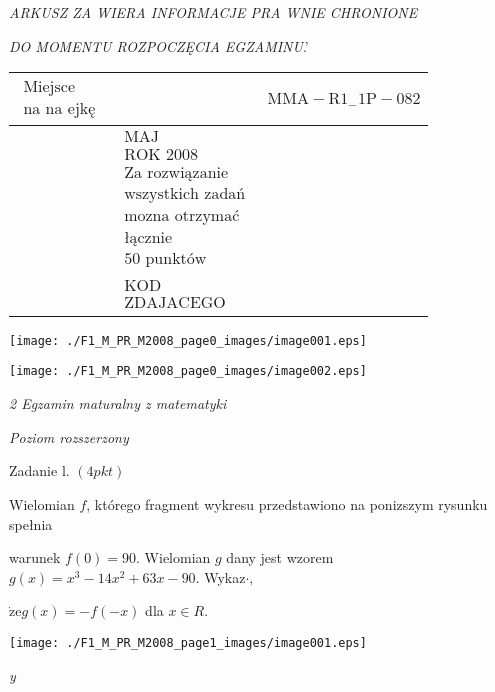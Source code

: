 \documentclass[a4paper,12pt]{article}
\begin{document}
{\it ARKUSZ ZA WIERA INFORMACJE PRA WNIE CHRONIONE}

{\it DO MOMENTU ROZPOCZĘCIA EGZAMINU}.'
\begin{center}
\begin{tabular}{|l|l|l}
\cline{1-1}
\multicolumn{1}{|l|}{$\begin{array}{l}\mbox{Miejsce}	\\	\mbox{na na ejkę}	\end{array}$}&	\multicolumn{1}{|l|}{}&	\multicolumn{1}{|l}{ $\mathrm{M}\mathrm{M}\mathrm{A}-\mathrm{R}1_{-}1\mathrm{P}-082$}	\\
\hline
&	\multicolumn{1}{|l}{$\begin{array}{l}\mbox{MAJ}	\\	\mbox{ROK 2008}	\\	\mbox{Za rozwiązanie}	\\	\mbox{wszystkich zadań}	\\	\mbox{mozna otrzymać}	\\	\mbox{łącznie}	\\	\mbox{50 punktów}	\end{array}$}	\\
\cline{3-3}
&	\multicolumn{1}{|l}{$\begin{array}{l}\mbox{KOD}	\\	\mbox{ZDAJACEGO}	\end{array}$}
\end{tabular}


\texttt{[image: ./F1\_M\_PR\_M2008\_page0\_images/image001.eps]}

\texttt{[image: ./F1\_M\_PR\_M2008\_page0\_images/image002.eps]}
\end{center}



{\it 2 Egzamin maturalny z matematyki}

{\it Poziom rozszerzony}

Zadanie l. $(4pkt)$

Wielomian $f$, którego fragment wykresu przedstawiono na ponizszym rysunku spełnia

warunek $f(0)=90$. Wielomian $g$ dany jest wzorem $g(x)=x^{3}-14x^{2}+63x-90$. Wykaz$\cdot,$

$\dot{\mathrm{z}}\mathrm{e}g(x)=-f(-x)$ dla $x\in R.$
\begin{center}
\texttt{[image: ./F1\_M\_PR\_M2008\_page1\_images/image001.eps]}
\end{center}
{\it y}
\end{document}
